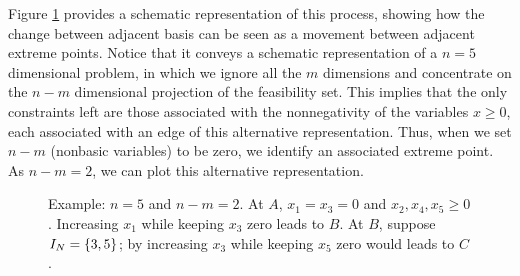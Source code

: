 
Figure \ref{p1c3:fig:adjacent_vertices} provides a schematic representation of this process, showing how the change between adjacent basis can be seen as a movement between adjacent extreme points. Notice that it conveys a schematic representation of a $n=5$ dimensional problem, in which we ignore all the $m$ dimensions and concentrate on the $n-m$ dimensional projection of the feasibility set. This implies that the only constraints left are those associated with the nonnegativity of the variables $x \ge 0$, each associated with an edge of this alternative representation. Thus, when we set $n-m$ (nonbasic variables) to be zero, we identify an associated extreme point. As $n-m = 2$, we can plot this alternative representation.

\begin{figure}
	\caption{Example: $n = 5$ and $n-m = 2$. At $A$, $x_1 = x_3 = 0$ and $x_2, x_4, x_5 \geq 0$. Increasing $x_1$ while keeping $x_3$ zero leads to $B$. At $B$, suppose $I_N = \left\{ 3,5 \right \}$; by increasing $x_3$ while keeping $x_5$ zero would leads to $C$.} \label{p1c3:fig:adjacent_vertices}
\end{figure}

